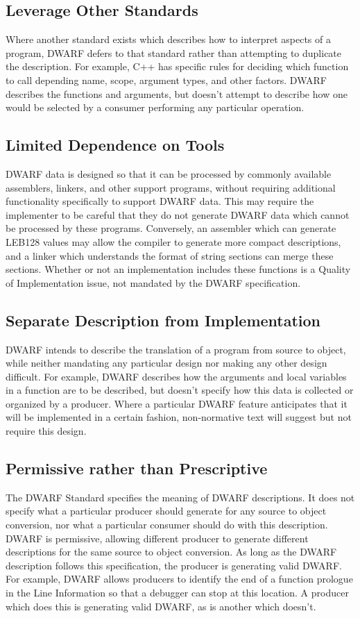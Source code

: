 \subsection{Leverage Other Standards}
Where another standard exists which describes how to interpret aspects of a program, DWARF defers to that standard rather than attempting to duplicate the description.  For example, C++ has specific rules for deciding which function to call depending name, scope, argument types, and other factors.  DWARF describes the functions and arguments, but doesn't attempt to describe how one would be selected by a consumer performing any particular operation.

\subsection{Limited Dependence on Tools}
DWARF data is designed so that it can be processed by commonly available assemblers, linkers, and other support programs, without requiring additional functionality specifically to support DWARF data.  This may require the implementer to be careful that they do not generate DWARF data which cannot be processed by these programs.  
Conversely, an assembler which can generate LEB128 values may allow the compiler to generate more compact descriptions, and a linker which understands the format of string sections can merge these sections.  Whether or not an implementation includes these functions is a Quality of Implementation issue, not mandated by the DWARF specification.

\subsection{Separate Description from Implementation}
DWARF intends to describe the translation of a program from source to object, while neither mandating any particular design nor making any other design difficult.  For example, DWARF describes how the arguments and local variables in a function are to be described, but doesn't specify how this data is collected or organized by a producer.  
Where a particular DWARF feature anticipates that it will be implemented in a certain fashion, non-normative text will suggest but not require this design.

\subsection{Permissive rather than Prescriptive}
The DWARF Standard specifies the meaning of DWARF descriptions.  It does not specify what a particular producer should generate for any source to object conversion, nor what a particular consumer should do with this description.  DWARF is permissive, allowing different producer to generate different descriptions for the same source to object conversion.  As long as the DWARF description follows this specification, the producer is generating valid DWARF.
For example, DWARF allows producers to identify the end of a function prologue in the Line Information so that a debugger can stop at this location.  A producer which does this is generating valid DWARF, as is another which doesn't.  

